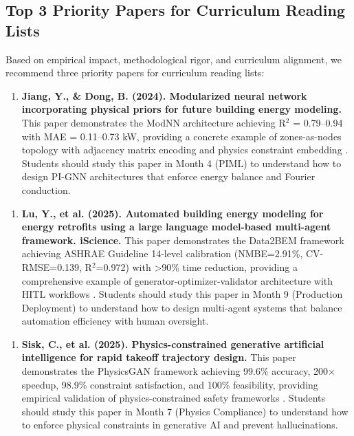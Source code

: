 \documentclass[12pt,a4paper]{article}
\begin{document}
\subsection{Top 3 Priority Papers for Curriculum Reading Lists}

Based on empirical impact, methodological rigor, and curriculum alignment, we recommend three priority papers for curriculum reading lists:

\begin{enumerate}
  \item \textbf{Jiang, Y., \& Dong, B. (2024). Modularized neural network incorporating physical priors for future building energy modeling.} This paper demonstrates the ModNN architecture achieving R$^2$ = 0.79--0.94 with MAE = 0.11--0.73 kW, providing a concrete example of zones-as-nodes topology with adjacency matrix encoding and physics constraint embedding \cite{ref370}. Students should study this paper in Month 4 (PIML) to understand how to design PI-GNN architectures that enforce energy balance and Fourier conduction.
\end{enumerate}

\begin{enumerate}
  \item \textbf{Lu, Y., et al. (2025). Automated building energy modeling for energy retrofits using a large language model-based multi-agent framework. iScience.} This paper demonstrates the Data2BEM framework achieving ASHRAE Guideline 14-level calibration (NMBE=2.91\%, CV-RMSE=0.139, R$^2$=0.972) with >90\% time reduction, providing a comprehensive example of generator-optimizer-validator architecture with HITL workflows \cite{ref371}. Students should study this paper in Month 9 (Production Deployment) to understand how to design multi-agent systems that balance automation efficiency with human oversight.
\end{enumerate}

\begin{enumerate}
  \item \textbf{Sisk, C., et al. (2025). Physics-constrained generative artificial intelligence for rapid takeoff trajectory design.} This paper demonstrates the PhysicsGAN framework achieving 99.6\% accuracy, 200$\times$ speedup, 98.9\% constraint satisfaction, and 100\% feasibility, providing empirical validation of physics-constrained safety frameworks \cite{ref372}. Students should study this paper in Month 7 (Physics Compliance) to understand how to enforce physical constraints in generative AI and prevent hallucinations.
\end{enumerate}
\end{document}

